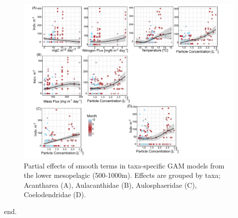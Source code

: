 \documentclass[
]{article}
\begin{document}
\newpage

\begin{figure}

{\centering \includegraphics{images/08_lomeso-partials.pdf}

}

\caption{Partial effects of smooth terms in taxa-specific GAM models
from the lower mesopelagic (500-1000m). Effects are grouped by taxa;
Acantharea (A), Aulacanthidae (B), Aulosphaeridae (C), Coelodendridae
(D).}

\end{figure}

\newpage

end.
\end{document}
